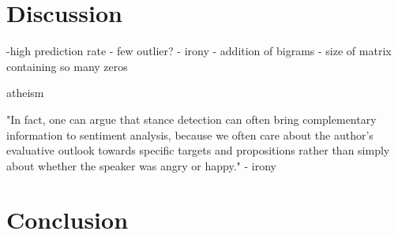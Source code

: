 \documentclass[a4paper,12pt,twoside]{article}
\begin{document}
\section{Discussion}

-high prediction rate
- few outlier?
- irony
- addition of bigrams
- size of matrix containing so many zeros

atheism




"In fact, one can argue that stance detection can often bring complementary information to sentiment analysis, because we often care about the author’s evaluative outlook towards specific targets and propositions rather than simply about whether the speaker was angry or happy."
- irony
 

\section{Conclusion}




 
\end{document}
